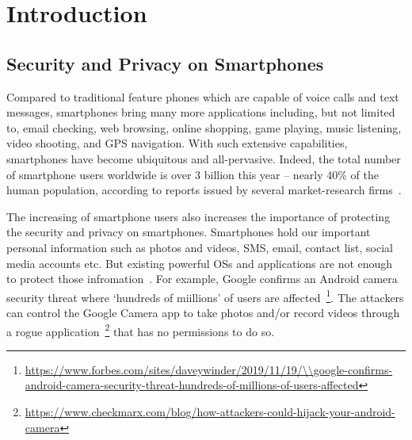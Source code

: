 \chapter{Introduction}

%	
%	
%	

\section{Security and Privacy on Smartphones}
Compared to traditional feature phones which are capable of voice calls and text messages,
%
smartphones bring many more applications including, but not limited to, email checking, web browsing, online shopping, game playing, music listening, video shooting, and GPS navigation.
%
%
%
%
With such extensive capabilities, smartphones have become ubiquitous and all-pervasive.
%
Indeed, the total number of smartphone users worldwide is over 3 billion this year -- nearly 40\% of the human population, according to reports issued by several market-research firms~\cite{report2018newzoo,report2019forrester}. 


The increasing of smartphone users also increases the importance of protecting the security and privacy on smartphones. 
%
Smartphones hold our important personal information such as photos and videos, SMS, email, contact list, social media accounts etc. But existing powerful OSs and applications are not enough to protect those infromation~\cite{ali2019security}. For example, Google confirms an Android camera security threat where `hundreds of miillions' of users are affected~\footnote{\url{https://www.forbes.com/sites/daveywinder/2019/11/19/\\google-confirms-android-camera-security-threat-hundreds-of-millions-of-users-affected}}. The attackers can control the Google Camera app to take photos and/or record videos through a rogue application~\footnote{\url{https://www.checkmarx.com/blog/how-attackers-could-hijack-your-android-camera}} that has no permissions to do so. 


